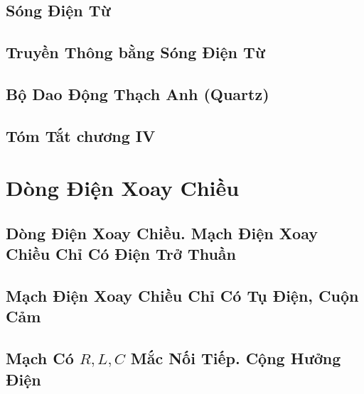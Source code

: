\documentclass{article}
\numberwithin{equation}{section}
\begin{document}

\subsection{Sóng Điện Từ}


\subsection{Truyền Thông bằng Sóng Điện Từ}


\subsection{Bộ Dao Động Thạch Anh (Quartz)}


\subsection{Tóm Tắt chương IV}


\section{Dòng Điện Xoay Chiều}

\subsection{Dòng Điện Xoay Chiều. Mạch Điện Xoay Chiều Chỉ Có Điện Trở Thuần}


\subsection{Mạch Điện Xoay Chiều Chỉ Có Tụ Điện, Cuộn Cảm}


\subsection{Mạch Có $R,L,C$ Mắc Nối Tiếp. Cộng Hưởng Điện}
\end{document}
